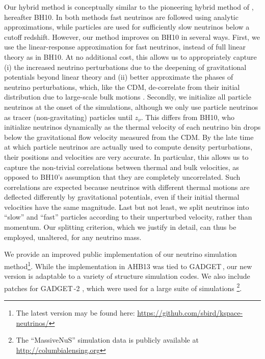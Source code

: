 \documentclass[useAMS, usenatbib]{mnras}
\newcommand{\gadget}{{\small GADGET\,}}
\begin{document}
Our hybrid method is conceptually similar to the pioneering hybrid method of \cite{Brandbyge_2010}, hereafter BH10. In both methods fast neutrinos are followed using analytic approximations, while particles are used for sufficiently slow neutrinos below a cutoff redshift. However, our method improves on BH10 in several ways. First, we use the linear-response approximation for fast neutrinos, instead of full linear theory as in BH10. At no additional cost, this allows us to appropriately capture (i) the increased neutrino perturbations due to the deepening of gravitational potentials beyond linear theory and (ii) better approximate the phases of neutrino perturbations, which, like the CDM, de-correlate from their initial distribution due to large-scale bulk motions \citep[see e.g.][]{Tassev:2012}. Secondly, we initialize all particle neutrinos at the onset of the simulations, although we only use particle neutrinos as tracer (non-gravitating) particles until $z_\nu$. This differs from BH10, who initialize neutrinos dynamically as the thermal velocity of each neutrino bin drops below the gravitational flow velocity measured from the CDM.
By the late time at which particle neutrinos are actually used to compute density perturbations, their positions and velocities are very accurate. In particular, this allows us to capture the non-trivial correlations between thermal and bulk velocities, as opposed to BH10’s assumption that they are completely uncorrelated. Such correlations are expected because neutrinos with different thermal motions are deflected differently by gravitational potentials, even if their initial thermal velocities have the same magnitude.
Last but not least, we split neutrinos into ``slow” and “fast” particles according to their unperturbed velocity, rather than momentum. Our splitting criterion, which we justify in detail, can thus be employed, unaltered, for any neutrino mass.


We provide an improved public implementation of our neutrino simulation
method\footnote{The latest version may be found here: \url{https://github.com/sbird/kspace-neutrinos/}}.
While the implementation in AHB13 was tied to \gadget \citep{Springel_2005}, our new version is adaptable to a variety of structure simulation codes. We also include patches for \gadget-2 \citep{Springel_2005}, which were used for a large suite of simulations \cite[``MassiveNuS'': ][]{Liu_2017}\footnote{The ``MassiveNuS'' simulation data is publicly available at \url{http://columbialensing.org}}.
\end{document}
